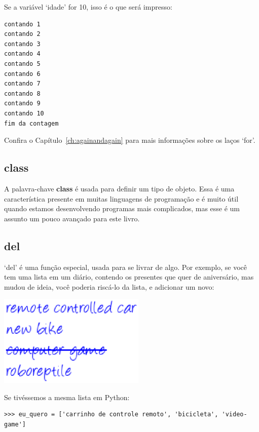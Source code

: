 \noindent
Se a variável `idade' for 10, isso é o que será impresso:

\begin{listing}
\begin{verbatim}
contando 1
contando 2
contando 3
contando 4
contando 5
contando 6
contando 7
contando 8
contando 9
contando 10
fim da contagem
\end{verbatim}
\end{listing}

\noindent
Confira o Capítulo~\ref{ch:againandagain} para mais informações sobre os laços `for'.

\subsection*{class}

A palavra-chave \textbf{class} é usada para definir um tipo de objeto. Essa é uma característica presente em muitas linguagens de programação e é muito útil quando estamos desenvolvendo programas mais complicados, mas esse é um assunto um pouco avançado para este livro.

\subsection*{del}

`del' é uma função especial, usada para se livrar de algo. Por exemplo, se você tem uma lista em um diário, contendo os presentes que quer de aniversário, mas mudou de ideia, você poderia riscá-lo da lista, e adicionar um novo:

\begin{center}
\includegraphics*[width=70mm]{eps/list.eps}
\end{center}

\noindent
Se tivéssemos a mesma lista em Python:

\begin{listing}
\begin{verbatim}
>>> eu_quero = ['carrinho de controle remoto', 'bicicleta', 'video-game']
\end{verbatim}
\end{listing}

